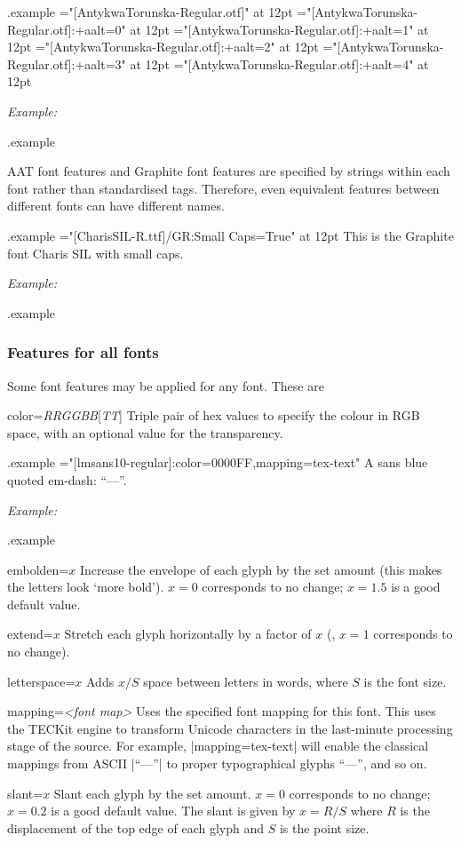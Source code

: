 \documentclass[12pt]{article}
\newenvironment{optdesc}
  {\begin{description}[font=\ttfamily,style=nextline,leftmargin=1.5cm]}
  {\end{description}}
\edef\examplefilename{\jobname.example}
\newlength\exampleindent
\newenvironment{example}
  {\VerbatimEnvironment
   \begin{VerbatimOut}{\examplefilename}}
  {\end{VerbatimOut}
   \typesetexample}
\newcommand\typesetexample{%
  \begin{trivlist}\item[]
  \vrule
  \hspace{\exampleindent}
  \begin{minipage}{\linewidth-\exampleindent-\exampleindent}
    \textit{Example:}\par
    \vspace{0.4\baselineskip}
    \BVerbatimInput[fontsize=\small]{\examplefilename}\par
    \vspace{0.4\baselineskip}
    \color[rgb]{0.7,0,0}\examplefilename\relax
  \end{minipage}\par
  \end{trivlist}}
\let\latin\relax %
\def\ie{\latin{i.e.}}
\begin{document}
\begin{example}
\font\antt="[AntykwaTorunska-Regular.otf]"         at 12pt 
\font\antt="[AntykwaTorunska-Regular.otf]:+aalt=0" at 12pt 
\font\antt="[AntykwaTorunska-Regular.otf]:+aalt=1" at 12pt 
\font\antt="[AntykwaTorunska-Regular.otf]:+aalt=2" at 12pt 
\font\antt="[AntykwaTorunska-Regular.otf]:+aalt=3" at 12pt 
\font\antt="[AntykwaTorunska-Regular.otf]:+aalt=4" at 12pt 
\end{example}

AAT font features and Graphite font features are specified by strings
within each font rather than standardised tags. Therefore, even
equivalent features between different fonts can have different names.

\begin{example}
\font\gra="[CharisSIL-R.ttf]/GR:Small Caps=True" at 12pt
\gra This is the Graphite font Charis SIL with small caps.
\end{example}

\subsubsection{Features for all fonts}

Some font features may be applied for any font. These are
\begin{optdesc}

\item[color={\slshape RRGGBB}{[{\slshape TT}]}]
Triple pair of hex values to specify the colour in RGB space, with an
optional value for the transparency.

\begin{example}
\font\9="[lmsans10-regular]:color=0000FF,mapping=tex-text"
\9 A sans blue quoted em-dash: ``---''.
\end{example}

\item[embolden=$x$]
Increase the envelope of each glyph by the set amount (this makes the
letters look ‘more bold’). $x=0$ corresponds to no change; $x=1.5$ is a
good default value.

\item[extend=$x$]
Stretch each glyph horizontally by a factor of $x$ (\ie, $x=1$
corresponds to no change).

\item[letterspace=$x$]
Adds $x/S$ space between letters in words, where $S$ is the font size.

\item[mapping=\textsl{<font map>}]
Uses the specified font mapping for this font. This uses the TECKit
engine to transform Unicode characters in the last-minute processing
stage of the source. For example, |mapping=tex-text| will enable the
classical mappings from ASCII |``---''| to proper typographical
glyphs “—”, and so on.

\item[slant=$x$]
Slant each glyph by the set amount. $x=0$ corresponds to no change;
$x=0.2$ is a good default value. The slant is given by $x=R/S$ where $R$
is the displacement of the top edge of each glyph and $S$ is the point
size.

\end{optdesc}
\end{document}
